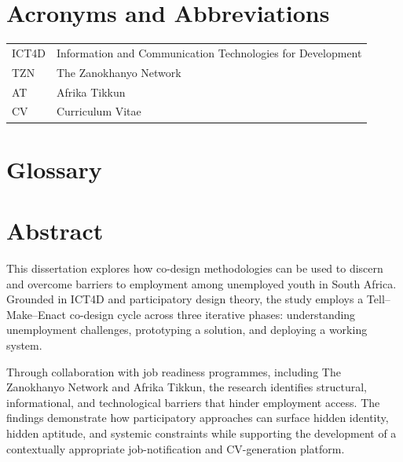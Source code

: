 \documentclass[12pt,a4paper,oneside]{report}
\begin{document}


\chapter*{Acronyms and Abbreviations}

\begin{tabular}{ll}
ICT4D & Information and Communication Technologies for Development \\
TZN & The Zanokhanyo Network \\
AT & Afrika Tikkun \\
CV & Curriculum Vitae \\
\end{tabular}


\chapter*{Glossary}



\chapter*{Abstract}

This dissertation explores how co-design methodologies can be used to discern and overcome barriers to employment among unemployed youth in South Africa. Grounded in ICT4D and participatory design theory, the study employs a Tell–Make–Enact co-design cycle across three iterative phases: understanding unemployment challenges, prototyping a solution, and deploying a working system.

Through collaboration with job readiness programmes, including The Zanokhanyo Network and Afrika Tikkun, the research identifies structural, informational, and technological barriers that hinder employment access. The findings demonstrate how participatory approaches can surface hidden identity, hidden aptitude, and systemic constraints while supporting the development of a contextually appropriate job-notification and CV-generation platform.
\end{document}
